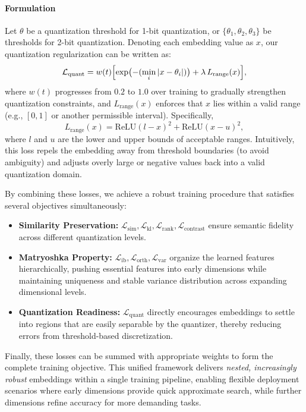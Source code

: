 \paragraph{Formulation}
Let $\theta$ be a quantization threshold for 1-bit quantization, or $\{\theta_1, \theta_2, \theta_3\}$ be thresholds for 2-bit quantization. Denoting each embedding value as $x$, our quantization regularization can be written as:
\begin{equation}
    \mathcal{L}_{\text{quant}} 
    = 
    w(t) 
    \Bigl[
        \exp\bigl(-(\min_i |x - \theta_i|)\bigr) 
        + 
        \lambda\,L_{\text{range}}(x)
    \Bigr],
\end{equation}
where $w(t)$ progresses from $0.2$ to $1.0$ over training to gradually strengthen quantization constraints, and $L_{\text{range}}(x)$ enforces that $x$ lies within a valid range (e.g., $[0,1]$ or another permissible interval). Specifically,
\begin{equation}
    L_{\text{range}}(x) 
    = 
    \text{ReLU}(l - x)^2 
    + 
    \text{ReLU}(x - u)^2,
\end{equation}
where $l$ and $u$ are the lower and upper bounds of acceptable ranges. Intuitively, this loss repels the embedding away from threshold boundaries (to avoid ambiguity) and adjusts overly large or negative values back into a valid quantization domain.


By combining these losses, we achieve a robust training procedure that satisfies several objectives simultaneously:
\begin{itemize}
    \item \textbf{Similarity Preservation:} $\mathcal{L}_{\text{sim}}, \mathcal{L}_{\text{kl}}, \mathcal{L}_{\text{rank}}, \mathcal{L}_{\text{contrast}}$ ensure semantic fidelity across different quantization levels.
    \item \textbf{Matryoshka Property:} $\mathcal{L}_{\text{ib}}, \mathcal{L}_{\text{orth}}, \mathcal{L}_{\text{var}}$ organize the learned features hierarchically, pushing essential features into early dimensions while maintaining uniqueness and stable variance distribution across expanding dimensional levels.
    \item \textbf{Quantization Readiness:} $\mathcal{L}_{\text{quant}}$ directly encourages embeddings to settle into regions that are easily separable by the quantizer, thereby reducing errors from threshold-based discretization.
\end{itemize}

Finally, these losses can be summed with appropriate weights to form the complete training objective.
This unified framework delivers \emph{nested, increasingly robust} embeddings within a single training pipeline, enabling flexible deployment scenarios where early dimensions provide quick approximate search, while further dimensions refine accuracy for more demanding tasks.

